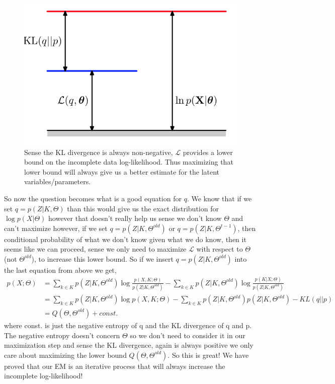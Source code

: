 \begin{figure}[!h]
\includegraphics[scale=0.5]{KL}
\caption{Sense the KL divergence is always non-negative, $\mathcal{L}$ provides a lower bound on the incomplete data log-likelihood. Thus maximizing that lower bound will always give us a better estimate for the latent variables/parameters.}
\end{figure}
So now the question becomes what is a good equation for $q$. We know that if we set $q=p(Z|K, \Theta)$ than this would give us the exact distribution for $\log p(X|\Theta)$ however that doesn't really help us sense we don't know $\Theta$ and can't maximize however, if we set $q=p(Z|K,\Theta^{old})$ or $q=p(Z|K,\Theta^{t-1})$, then conditional probability of what we don't know given what we do know, then it seems like we can proceed, sense we only need to maximize $\mathcal{L}$ with respect to $\Theta$ (not $\Theta^{old}$), to increase this lower bound. So if we insert $q=p(Z|K,\Theta^{old})$ into the last equation from above we get, 
\begin{align}
p(X;\Theta)&=\sum_{k\in K}p(Z|K,\Theta^{old})\log\frac{p(X,K;\Theta)}{p(Z|K,\Theta^{old})} - \sum_{k\in K}p(Z|K,\Theta^{old})\log\frac{p(K|X;\Theta)}{p(Z|K,\Theta^{old})} \\
&=\sum_{k\in K}p(Z|K,\Theta^{old})\log{p(X,K;\Theta)}-\sum_{k\in K}p(Z|K,\Theta^{old}){p(Z|K,\Theta^{old})} - KL(q||p)\\
&=Q(\Theta, \Theta^{old}) + const.
\end{align}
where const. is just the negative entropy of q and the KL divergence of q and p. The negative entropy doesn't concern $\Theta$ so we don't need to consider it in our maximization step and sense the KL divergence, again is always positive we only care about maximizing the lower bound $Q(\Theta, \Theta^{old})$. So this is great! We have proved that our EM is an iterative process that will always increase the incomplete log-likelihood! 


























